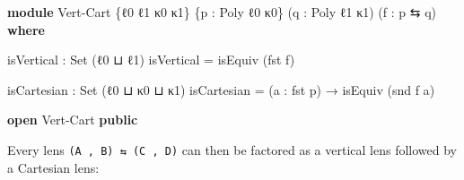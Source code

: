 \documentclass[
  11pt,
  oneside,
  article]{memoir}
\newenvironment{Shaded}{}{}
\newcommand{\DataTypeTok}[1]{\textcolor[rgb]{0.56,0.13,0.00}{#1}}
\newcommand{\KeywordTok}[1]{\textcolor[rgb]{0.00,0.44,0.13}{\textbf{#1}}}
\newcommand{\NormalTok}[1]{#1}
\newcommand{\OtherTok}[1]{\textcolor[rgb]{0.00,0.44,0.13}{#1}}
\theoremstyle{definition}
\theoremstyle{plain}
\newcommand{\0}{\textsf{0}}
\newcommand{\1}{\tn{\textsf{1}}}
\begin{document}
\begin{Shaded}
\begin{Highlighting}[]
\KeywordTok{module}\NormalTok{ Vert{-}Cart }\OtherTok{\{}\NormalTok{ℓ0 ℓ1 κ0 κ1}\OtherTok{\}} \OtherTok{\{}\NormalTok{p }\OtherTok{:}\NormalTok{ Poly ℓ0 κ0}\OtherTok{\}} 
                 \OtherTok{(}\NormalTok{q }\OtherTok{:}\NormalTok{ Poly ℓ1 κ1}\OtherTok{)} \OtherTok{(}\NormalTok{f }\OtherTok{:}\NormalTok{ p ⇆ q}\OtherTok{)} \KeywordTok{where}

\NormalTok{    isVertical }\OtherTok{:} \DataTypeTok{Set} \OtherTok{(}\NormalTok{ℓ0 ⊔ ℓ1}\OtherTok{)}
\NormalTok{    isVertical }\OtherTok{=}\NormalTok{ isEquiv }\OtherTok{(}\NormalTok{fst f}\OtherTok{)}

\NormalTok{    isCartesian }\OtherTok{:} \DataTypeTok{Set} \OtherTok{(}\NormalTok{ℓ0 ⊔ κ0 ⊔ κ1}\OtherTok{)}
\NormalTok{    isCartesian }\OtherTok{=} \OtherTok{(}\NormalTok{a }\OtherTok{:}\NormalTok{ fst p}\OtherTok{)} \OtherTok{→}\NormalTok{ isEquiv }\OtherTok{(}\NormalTok{snd f a}\OtherTok{)}

\KeywordTok{open}\NormalTok{ Vert{-}Cart }\KeywordTok{public}
\end{Highlighting}
\end{Shaded}

Every lens \texttt{(A\ ,\ B)\ ⇆\ (C\ ,\ D)} can then be factored as a
vertical lens followed by a Cartesian lens:
\end{document}
